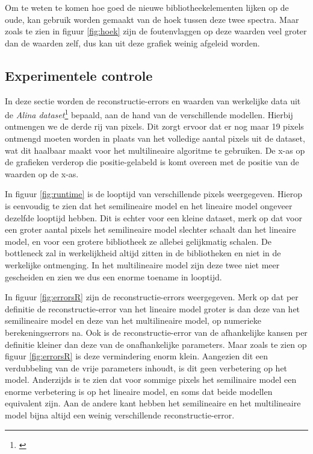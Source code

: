\documentclass[12pt]{report}
\newcommand{\footcite}[1]{\cite{#1}\let\thefootnote\relax \footnote{\cite{#1} \bibentry{#1}} }
\begin{document}
Om te weten te komen hoe goed de nieuwe bibliotheekelementen lijken op de oude, kan gebruik worden gemaakt van de hoek tussen deze twee spectra. Maar  zoals te zien in figuur \ref{fig:hoek} zijn de foutenvlaggen op deze waarden veel groter dan de waarden zelf, dus kan uit deze grafiek weinig afgeleid worden.


\subsection{Experimentele controle} \label{sec:exp}

In deze sectie worden de reconstructie-errors en waarden van werkelijke data uit de \textit{Alina dataset}\footcite{alina} bepaald, aan de hand van de verschillende modellen. Hierbij ontmengen we de derde rij van pixels. Dit zorgt ervoor dat er nog maar 19 pixels ontmengd moeten worden in plaats van het volledige aantal pixels uit de dataset, wat dit haalbaar maakt voor het multilineaire algoritme te gebruiken. De x-as op de grafieken verderop die positie-gelabeld is komt overeen met de positie van de waarden op de x-as.

In figuur \ref{fig:runtime} is de looptijd van verschillende pixels weergegeven. Hierop is eenvoudig te zien dat het semilineaire model en het lineaire model ongeveer dezelfde looptijd hebben. Dit is echter voor een kleine dataset, merk op dat voor een groter aantal pixels het semilineaire model slechter schaalt dan het lineaire model, en voor een grotere bibliotheek ze allebei gelijkmatig schalen. De bottleneck zal in werkelijkheid altijd zitten in de bibliotheken en niet in de werkelijke ontmenging. In het multilineaire model zijn deze twee niet meer gescheiden en zien we dus een enorme toename in looptijd.

In figuur \ref{fig:errorsR} zijn de reconstructie-errors weergegeven. Merk op dat per definitie de reconstructie-error van het lineaire model groter is dan deze van het semilineaire model en deze van het multilineaire model, op numerieke berekeningserrors na. Ook is de reconstructie-error van de afhankelijke kansen per definitie kleiner dan deze van de onafhankelijke parameters. Maar zoals te zien op figuur \ref{fig:errorsR} is deze vermindering enorm klein. Aangezien dit een verdubbeling van de vrije parameters inhoudt, is dit geen verbetering op het model. Anderzijds is te zien dat voor sommige pixels het semilinaire model een enorme verbetering is op het lineaire model, en soms dat beide modellen equivalent zijn. Aan de andere kant hebben het semilineaire en het multilineaire model bijna altijd een weinig verschillende reconstructie-error. 
\end{document}
